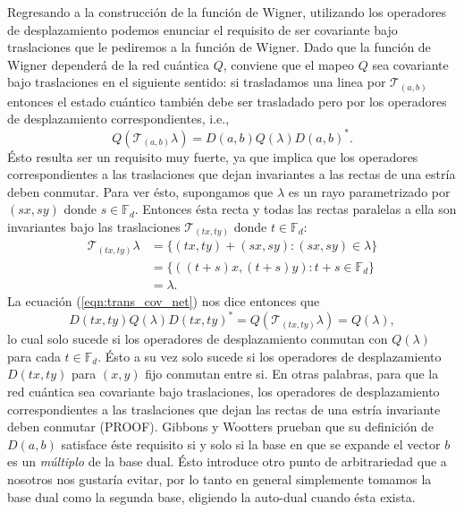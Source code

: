 \documentclass[a4paper]{report}
\begin{document}
  Regresando a la construcción de la función de Wigner,
  utilizando los operadores de desplazamiento podemos
  enunciar el requisito de ser covariante bajo traslaciones
  que le pediremos a la función de Wigner. Dado que la
  función de Wigner dependerá de la red cuántica $Q$,
  conviene que el mapeo $Q$ sea covariante bajo traslaciones
  en el siguiente sentido: si trasladamos una linea por
  $\mathcal T_{(a,b)}$ entonces el estado cuántico también
  debe ser trasladado pero por los operadores de
  desplazamiento correspondientes, i.e.,
  \begin{equation}
    \label{eqn:trans_cov_net}
    Q(\mathcal T_{(a,b)} \lambda)
    = D(a,b) Q(\lambda) D(a,b)^{*}.
  \end{equation}
  Ésto resulta ser un requisito muy fuerte, ya que implica
  que los operadores correspondientes a las traslaciones que
  dejan invariantes a las rectas de una estría deben
  conmutar. Para ver ésto, supongamos que $\lambda$ es un
  rayo parametrizado por $(sx,sy)$ donde $s \in \mathbb
  F_d$. Entonces ésta recta y todas las rectas paralelas a
  ella son invariantes bajo las traslaciones $\mathcal
  T_{(tx,ty)}$ donde $t \in \mathbb F_d$:
  \begin{align*}
    \mathcal T_{(tx,ty)} \lambda
    &= \{(tx,ty) + (sx,sy) : (sx,sy) \in \lambda \} \\
    &= \{((t+s)x, (t+s)y) : t+s \in \mathbb F_d \}\\
    &= \lambda.
  \end{align*} 
  La ecuación (\ref{eqn:trans_cov_net}) nos dice entonces
  que
  \[
    D(tx,ty) Q(\lambda) D(tx,ty)^{*}
    = Q(\mathcal T_{(tx,ty)}\lambda)
    = Q(\lambda),
  \] 
  lo cual solo sucede si los operadores de desplazamiento
  conmutan con $Q(\lambda)$ para cada $t \in \mathbb F_d$.
  Ésto a su vez solo sucede si los operadores de
  desplazamiento $D(tx,ty)$ para $(x,y)$ fijo conmutan entre
  si. En otras palabras, para que la red cuántica sea
  covariante bajo traslaciones, los operadores de
  desplazamiento correspondientes a las traslaciones que
  dejan las rectas de una estría invariante deben conmutar
  (PROOF).  Gibbons y Wootters prueban que su definición de
  $D(a,b)$ satisface éste requisito si y solo si la base en
  que se expande el vector $b$ es un \textit{múltiplo} de la
  base dual. Ésto introduce otro punto de arbitrariedad que
  a nosotros nos gustaría evitar, por lo tanto en general
  simplemente tomamos la base dual como la segunda base,
  eligiendo la auto-dual cuando ésta exista.
\end{document}
